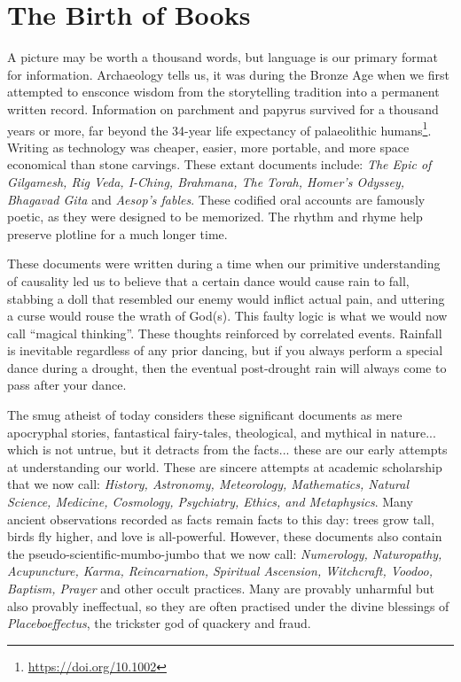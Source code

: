 \section{The Birth of Books}

A picture may be worth a thousand words, but language is our primary format for information. Archaeology tells us, it was during the Bronze Age when we first attempted to ensconce wisdom from the storytelling tradition into a permanent written record. Information on parchment and papyrus survived for a thousand years or more, far beyond the 34-year life expectancy of palaeolithic humans\footnote{\url{https://doi.org/10.1002}}. Writing as technology was cheaper, easier, more portable, and more space economical than stone carvings. These extant documents include: \textit{The Epic of Gilgamesh, Rig Veda, I-Ching, Brahmana, The Torah, Homer's Odyssey, Bhagavad Gita} and \textit{Aesop's fables}. These codified oral accounts are famously poetic, as they were designed to be memorized. The rhythm and rhyme help preserve plotline for a much longer time. 

These documents were written during a time when our primitive understanding of causality led us to believe that a certain dance would cause rain to fall, stabbing a doll that resembled our enemy would inflict actual pain, and uttering a curse would rouse the wrath of God(s). This faulty logic is what we would now call ``magical thinking''. These thoughts reinforced by correlated events. Rainfall is inevitable regardless of any prior dancing, but if you always perform a special dance during a drought, then the eventual post-drought rain will always come to pass after your dance.

The smug atheist of today considers these significant documents as mere apocryphal stories, fantastical fairy-tales, theological, and mythical in nature... which is not untrue, but it detracts from the facts... these are our early attempts at understanding our world. These are sincere attempts at academic scholarship that we now call: \textit{History, Astronomy, Meteorology, Mathematics, Natural Science, Medicine, Cosmology, Psychiatry, Ethics, and Metaphysics}. Many ancient observations recorded as facts remain facts to this day: trees grow tall, birds fly higher, and love is all-powerful. However, these documents also contain the pseudo-scientific-mumbo-jumbo that we now call: \textit{Numerology, Naturopathy, Acupuncture, Karma, Reincarnation, Spiritual Ascension, Witchcraft, Voodoo, Baptism, Prayer} and other occult practices. Many are provably unharmful but also provably ineffectual, so they are often practised under the divine blessings of \textit{Placeboeffectus}, the trickster god of quackery and fraud. 

